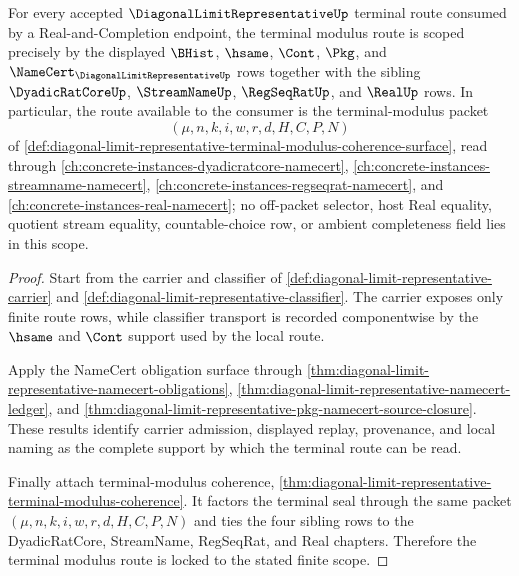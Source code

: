 \begin{theorem}
\label{thm:diagonal-limit-representative-terminal-modulus-scope-lock}
For every accepted $\DiagonalLimitRepresentativeUp$ terminal route consumed by a Real-and-Completion endpoint, the terminal modulus route is scoped precisely by the displayed $\BHist$, $\hsame$, $\Cont$, $\Pkg$, and $\NameCert_{\DiagonalLimitRepresentativeUp}$ rows together with the sibling $\DyadicRatCoreUp$, $\StreamNameUp$, $\RegSeqRatUp$, and $\RealUp$ rows. In particular, the route available to the consumer is the terminal-modulus packet
$$
(\mu,n,k,i,w,r,d,H,C,P,N)
$$
of \autoref{def:diagonal-limit-representative-terminal-modulus-coherence-surface}, read through \autoref{ch:concrete-instances-dyadicratcore-namecert}, \autoref{ch:concrete-instances-streamname-namecert}, \autoref{ch:concrete-instances-regseqrat-namecert}, and \autoref{ch:concrete-instances-real-namecert}; no off-packet selector, host Real equality, quotient stream equality, countable-choice row, or ambient completeness field lies in this scope.
\end{theorem}
\begin{proof}
Start from the carrier and classifier of \autoref{def:diagonal-limit-representative-carrier} and \autoref{def:diagonal-limit-representative-classifier}. The carrier exposes only finite route rows, while classifier transport is recorded componentwise by the $\hsame$ and $\Cont$ support used by the local route.

Apply the NameCert obligation surface through \autoref{thm:diagonal-limit-representative-namecert-obligations}, \autoref{thm:diagonal-limit-representative-namecert-ledger}, and \autoref{thm:diagonal-limit-representative-pkg-namecert-source-closure}. These results identify carrier admission, displayed replay, provenance, and local naming as the complete support by which the terminal route can be read.

Finally attach terminal-modulus coherence, \autoref{thm:diagonal-limit-representative-terminal-modulus-coherence}. It factors the terminal seal through the same packet $(\mu,n,k,i,w,r,d,H,C,P,N)$ and ties the four sibling rows to the DyadicRatCore, StreamName, RegSeqRat, and Real chapters. Therefore the terminal modulus route is locked to the stated finite scope.
\end{proof}

